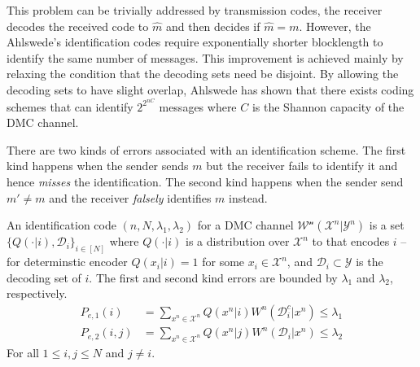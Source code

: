 \documentclass{article}
\begin{document}
This problem can be trivially addressed by transmission codes, the receiver decodes the received code to \(\hat{m}\) and then decides if \(\hat{m} = m\). However, the  Ahlswede's identification codes require exponentially shorter blocklength to identify the same number of messages. This improvement is achieved mainly by relaxing the condition that the decoding sets need be disjoint. By allowing the decoding sets to have slight overlap, Ahlswede \cite{idfeedback} has shown that there exists coding schemes that can identify \(2^{2^{nC}}\) messages where \(C\) is the Shannon capacity of the DMC channel.

There are two kinds of errors associated with an identification scheme. The first kind happens when the sender sends \(m\) but the receiver fails to identify it and hence \textit{misses} the identification. The second kind happens when the sender send \(m' \neq m\) and the receiver \textit{falsely} identifies \(m\) instead.

\begin{definition}\label{def:idcode}
	An identification code \((n, N,\lambda_1, \lambda_2)\) for a DMC channel \(\mathcal{W^n}(\mathcal{X}^n | \mathcal{Y}^n)\) is a set \(\{ Q( \cdot |i), \mathcal{D}_i \}_{i \in [N]}\) where \(Q(\cdot | i)\) is a distribution over \(\mathcal{X}^n\) to that encodes \(i\) -- for determinstic encoder \(Q(x_i | i) = 1\) for some \(x_i \in \mathcal{X}^n\), and \(\mathcal{D}_i \subset \mathcal{Y}\) is the decoding set of \(i\). The first and second kind errors are bounded by \(\lambda_1\) and \(\lambda_2\), respectively.
	\begin{align*}
		P_{e,1}(i)&= \sum_{x^n \in \mathcal{X}^n} Q(x^n | i) W^n(\mathcal{D}_i^c | x^n) \leq \lambda_1 \\
		P_{e,2}(i,j)&=\sum_{x^n \in \mathcal{X}^n} Q(x^n | j) W^n(\mathcal{D}_i | x^n) \leq \lambda_2
	\end{align*}
	For all \(1 \leq i,j \leq N\) and \(j \neq i\).
\end{definition}
\end{document}
